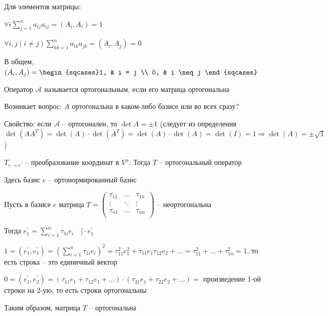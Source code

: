 \documentclass[12pt]{article}
\begin{document}
    Для элементов матрицы:

    $\forall i \sum^n_{j=1} a_{ij} a_{ij} = (A_i, A_i) = 1$

    $\forall i, j (i \neq j) \sum^n_{kk=1} a_{ik} a_{jk} = (A_i, A_j) = 0$

    В общем, $(A_i, A_j) = \begin{sqcases}1, & i = j \\ 0, & i \neq j \end{sqcases}$

    \Def Оператор $\mathcal{A}$ называется ортогональным, если его матрица ортогональна

    Возникает вопрос: $A$ ортогональна в каком-либо базисе или во всех сразу?

    Свойство: если $\mathcal{A}$ -- ортогонален, то $\det A = \pm 1$ (следует из определения $\det(AA^T) = \det(A) \cdot \det(A^T) = \det(A) \cdot \det(A) = \det(I) = 1 \Longrightarrow \det(A) = \pm \sqrt{1}$)

    \begin{MyTheorem}
        \Ths $T_{e\to e^\prime}$ -- преобразование координат в $V^n$. Тогда $T$ -- ортогональный оператор
    \end{MyTheorem}

    Здесь базис $e$ -- ортонормированный базис

    \begin{MyProof}
        Пусть в базисе $e$ матрица $T = \begin{pmatrix}
            \tau_{11} & \dots & \tau_{1n} \\
            \vdots & \ddots & \vdots \\
            \tau_{n1} & \dots & \tau_{nn} \\
        \end{pmatrix}$ -- неортогональна

        Тогда $e_1^\prime = \sum_{i=1}^n \tau_{1i} e_i \quad \Big| \cdot e_1^\prime$

        $1 = (e_1^\prime, e_1^\prime) = \left(\sum_{i=1}^n \tau_{1i} e_i\right)^2 =
        \tau^2_{11} e^2_1 + \tau_{11} e_1 \tau_{12} e_2 + \dots = \tau_{11}^2 + \dots + \tau_{1n}^2 = 1$, то есть строка -- это единичный вектор

        $0 = (e_1^\prime, e_2^\prime) = (\tau_{11} e_1 + \tau_{12}e_1 + \dots) \cdot
        (\tau_{21}e_1 + \tau_{22}e_2 + \dots) = $ произведение 1-ой строки на 2-ую, то есть строки ортогональны

        Таким образом, матрица $T$ -- ортогональна
    \end{MyProof}
\end{document}

